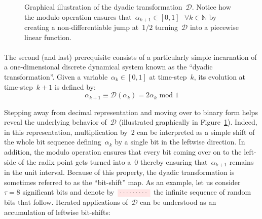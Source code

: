\documentclass{article}
\newcommand{\highlight}[2][yellow]{\mathchoice%
  {\colorbox{#1}{$\displaystyle#2$}}%
  {\colorbox{#1}{$\textstyle#2$}}%
  {\colorbox{#1}{$\scriptstyle#2$}}%
  {\colorbox{#1}{$\scriptscriptstyle#2$}}}%
\begin{document}
\begin{figure}
\begin{center}
\end{center} 
\caption{Graphical illustration of the dyadic transformation~$\mathcal{D}$.  Notice how the modulo operation ensures that~$\alpha_{k+1} \in [0,1] \,\,\,\, \forall k \in \mathbb{N}$ by creating a non-differentiable jump at~$1/2$ turning~$\mathcal{D}$ into a piecewise linear function.}
\label{fig:dyadic}
\end{figure}

\paragraph{} The second (and last) prerequisite consists of a particularly simple incarnation of a one-dimensional discrete dynamical system known as the ``dyadic transformation''.  Given a variable~$\alpha_k \in [0,1]$ at time-step~$k$, its evolution at time-step~$k+1$ is defined by:
\begin{equation}
\alpha_{k+1} \equiv \mathcal{D} (\alpha_k) = 2 \alpha_k \,\, \text{mod} \,\, 1
\label{eq:dyadic}
\end{equation}

\noindent Stepping away from decimal representation and moving over to binary form helps reveal the underlying behavior of~$\mathcal{D}$ (illustrated graphically in Figure~\ref{fig:dyadic}).  Indeed, in this representation, multiplication by~2 can be interpreted as a simple shift of the whole bit sequence defining~$\alpha_k$ by a single bit in the leftwise direction.  In addition, the modulo operation ensures that every bit coming over on to the left-side of the radix point gets turned into a~$0$ thereby ensuring that~$\alpha_{k+1}$ remains in the unit interval.  Because of this property, the dyadic transformation is sometimes referred to as the ``bit-shift'' map.  As an example, let us consider~$\tau=8$ significant bits and denote by~$\highlight[red!10]{\cdots \cdots \cdots}$ the infinite sequence of random bits that follow.  Iterated applications of~$\mathcal{D}$ can be understood as an accumulation of leftwise bit-shifts:
\end{document}
